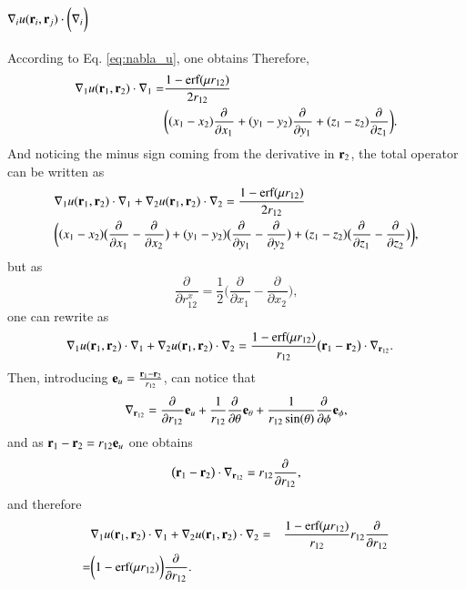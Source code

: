 \documentclass[aip,jcp,reprint,noshowkeys,superscriptaddress]{revtex4-1}
\newcommand{\deriv}[3]{\frac{\partial^{#3} #1}{\partial {#2}^{#3}}}
\newcommand{\br}[0]{{\bf {r}}}
\begin{document}
\subsection{$\nabla_i u(\br{}_i,\br{}_j) \cdot \bigg( \nabla_i   \bigg)$}
According to Eq. \eqref{eq:nabla_u}, one obtains 
Therefore, 
\begin{equation}
 \begin{aligned}
 \nabla_1 u(\br{}_1,\br{}_2) \cdot \nabla_1  = &\frac{1 - \text{erf}(\mu r_{12})}{2 r_{12}} \\ 
                                          &\bigg( (x_1 - x_2) \deriv{}{x_1}{} + (y_1 - y_2) \deriv{}{y_1}{} + (z_1 - z_2) \deriv{}{z_1}{}\bigg).
 \end{aligned}
\end{equation}
And noticing the minus sign coming from the derivative in $\br{}_2$, the total operator can be written as 
\begin{equation}
 \begin{aligned}
& \nabla_1 u(\br{}_1,\br{}_2) \cdot \nabla_1 + \nabla_2 u(\br{}_1,\br{}_2) \cdot \nabla_2 = \frac{1 - \text{erf}(\mu r_{12})}{2 r_{12}} \\
& \bigg( (x_1 - x_2) \big( \deriv{}{x_1}{} - \deriv{}{x_2}{} \big) +
         (y_1 - y_2) \big( \deriv{}{y_1}{} - \deriv{}{y_2}{} \big) +
         (z_1 - z_2) \big( \deriv{}{z_1}{} - \deriv{}{z_2}{} \big)\bigg),
 \end{aligned}
\end{equation}
but as 
\begin{equation}
 \deriv{}{r_{12}^x}{} = \frac{1}{2} \bigg( \deriv{}{x_1}{} - \deriv{}{x_2}{} \bigg),
\end{equation}
one can rewrite as 
\begin{equation}
 \begin{aligned}
 \label{eq:nabla_i_nabla0}
& \nabla_1 u(\br{}_1,\br{}_2) \cdot \nabla_1 + \nabla_2 u(\br{}_1,\br{}_2) \cdot \nabla_2 = \frac{1 - \text{erf}(\mu r_{12})}{r_{12}} \big( \br{}_1 - \br{}_2 \big) \cdot \nabla_{\br{}_{12}}.
 \end{aligned}
\end{equation}
Then, introducing ${\bf e}_u= \frac{\br{}_1 - \br{}_2}{r_{12}}$, can notice that 
\begin{equation}
 \nabla_{\br{}_{12}} = \deriv{}{r_{12}}{} {\bf e}_u + \frac{1}{r_{12}} \deriv{}{\theta}{} {\bf e}_{\theta} + \frac{1}{r_{12} \sin(\theta)} \deriv{}{\phi}{} {\bf e}_\phi,
\end{equation}
and as $\br{}_1 - \br{}_2 = r_{12} {\bf e}_u$ one obtains
\begin{equation}
 \big( \br{}_1 - \br{}_2 \big) \cdot \nabla_{\br{}_{12}} = r_{12} \deriv{}{r_{12}}{},
\end{equation}
and therefore 
\begin{equation}
 \begin{aligned}
 \label{eq:nabla_i_nabla1}
& \nabla_1 u(\br{}_1,\br{}_2) \cdot \nabla_1 + \nabla_2 u(\br{}_1,\br{}_2) \cdot \nabla_2 = & \frac{1 - \text{erf}(\mu r_{12})}{r_{12}} r_{12} \deriv{}{r_{12}}{} \\
 = & \bigg( 1 - \text{erf}(\mu r_{12})\bigg) \deriv{}{r_{12}}{}. 
 \end{aligned}
\end{equation}
\end{document}

